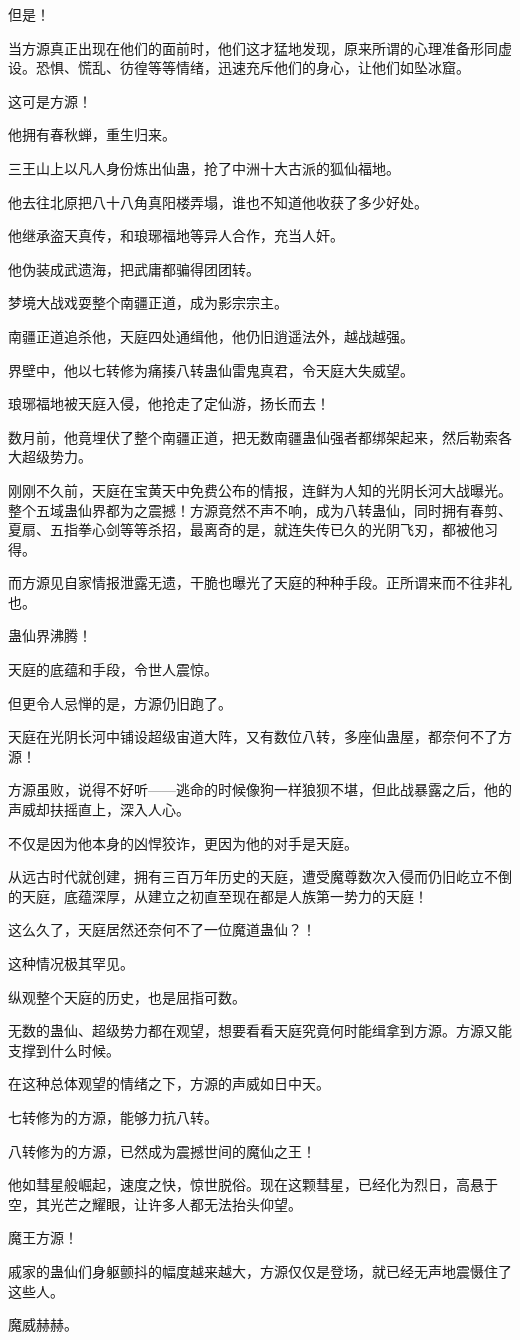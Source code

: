 \begin{this_body}
但是！

当方源真正出现在他们的面前时，他们这才猛地发现，原来所谓的心理准备形同虚设。恐惧、慌乱、彷徨等等情绪，迅速充斥他们的身心，让他们如坠冰窟。

这可是方源！

他拥有春秋蝉，重生归来。

三王山上以凡人身份炼出仙蛊，抢了中洲十大古派的狐仙福地。

他去往北原把八十八角真阳楼弄塌，谁也不知道他收获了多少好处。

他继承盗天真传，和琅琊福地等异人合作，充当人奸。

他伪装成武遗海，把武庸都骗得团团转。

梦境大战戏耍整个南疆正道，成为影宗宗主。

南疆正道追杀他，天庭四处通缉他，他仍旧逍遥法外，越战越强。

界壁中，他以七转修为痛揍八转蛊仙雷鬼真君，令天庭大失威望。

琅琊福地被天庭入侵，他抢走了定仙游，扬长而去！

数月前，他竟埋伏了整个南疆正道，把无数南疆蛊仙强者都绑架起来，然后勒索各大超级势力。

刚刚不久前，天庭在宝黄天中免费公布的情报，连鲜为人知的光阴长河大战曝光。整个五域蛊仙界都为之震撼！方源竟然不声不响，成为八转蛊仙，同时拥有春剪、夏扇、五指拳心剑等等杀招，最离奇的是，就连失传已久的光阴飞刃，都被他习得。

而方源见自家情报泄露无遗，干脆也曝光了天庭的种种手段。正所谓来而不往非礼也。

蛊仙界沸腾！

天庭的底蕴和手段，令世人震惊。

但更令人忌惮的是，方源仍旧跑了。

天庭在光阴长河中铺设超级宙道大阵，又有数位八转，多座仙蛊屋，都奈何不了方源！

方源虽败，说得不好听——逃命的时候像狗一样狼狈不堪，但此战暴露之后，他的声威却扶摇直上，深入人心。

不仅是因为他本身的凶悍狡诈，更因为他的对手是天庭。

从远古时代就创建，拥有三百万年历史的天庭，遭受魔尊数次入侵而仍旧屹立不倒的天庭，底蕴深厚，从建立之初直至现在都是人族第一势力的天庭！

这么久了，天庭居然还奈何不了一位魔道蛊仙？！

这种情况极其罕见。

纵观整个天庭的历史，也是屈指可数。

无数的蛊仙、超级势力都在观望，想要看看天庭究竟何时能缉拿到方源。方源又能支撑到什么时候。

在这种总体观望的情绪之下，方源的声威如日中天。

七转修为的方源，能够力抗八转。

八转修为的方源，已然成为震撼世间的魔仙之王！

他如彗星般崛起，速度之快，惊世脱俗。现在这颗彗星，已经化为烈日，高悬于空，其光芒之耀眼，让许多人都无法抬头仰望。

魔王方源！

戚家的蛊仙们身躯颤抖的幅度越来越大，方源仅仅是登场，就已经无声地震慑住了这些人。

魔威赫赫。

\end{this_body}

